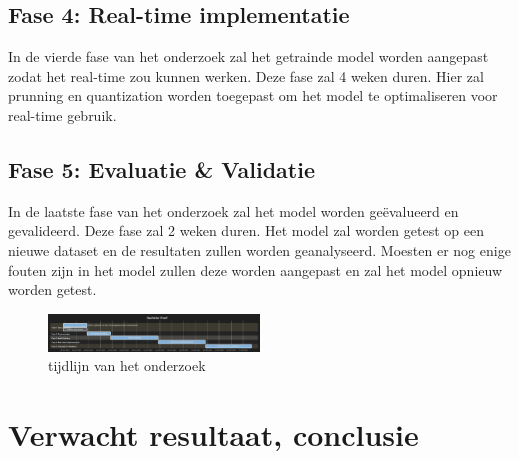 \subsection{Fase 4: Real-time implementatie}
In de vierde fase van het onderzoek zal het getrainde model worden aangepast zodat het real-time zou kunnen werken.
Deze fase zal 4 weken duren.
Hier zal prunning en quantization worden toegepast om het model te optimaliseren voor real-time gebruik.
\subsection{Fase 5: Evaluatie \& Validatie}
In de laatste fase van het onderzoek zal het model worden geëvalueerd en gevalideerd.
Deze fase zal 2 weken duren.
Het model zal worden getest op een nieuwe dataset en de resultaten zullen worden geanalyseerd.
Moesten er nog enige fouten zijn in het model zullen deze worden aangepast en zal het model opnieuw worden getest.

\begin{figure}[h!]
  \includegraphics[width=0.5\textwidth]{../graphics/gantt_tijd.png}
  \caption{tijdlijn van het onderzoek}
  \label{fig:gantt_tijd}
\end{figure}
\section{Verwacht resultaat, conclusie}%
\label{sec:verwachte_resultaten}
